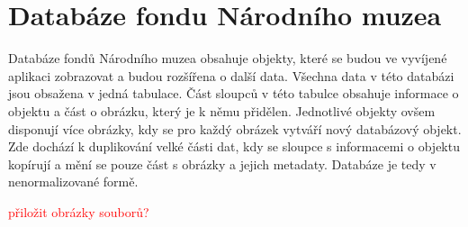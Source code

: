\section{Databáze fondu Národního muzea}

Databáze fondů Národního muzea obsahuje objekty, které se budou ve 
vyvíjené aplikaci zobrazovat a budou rozšířena o další data. Všechna data 
v této databázi jsou obsažena v jedná tabulace. Část sloupců v této tabulce 
obsahuje informace o objektu a část o obrázku, který je k němu přidělen. 
Jednotlivé objekty ovšem disponují více obrázky, kdy se pro každý obrázek 
vytváří nový databázový objekt. Zde dochází k duplikování velké části dat, 
kdy se sloupce s informacemi o objektu kopírují a mění se pouze část s 
obrázky a jejich metadaty. Databáze je tedy v nenormalizované formě.

\textcolor{red}{přiložit obrázky souborů?}


